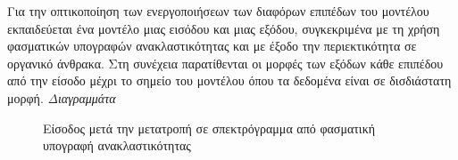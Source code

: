 Για την οπτικοποίηση των ενεργοποιήσεων των διαφόρων επιπέδων του μοντέλου εκπαιδεύεται ένα μοντέλο μιας εισόδου και μιας εξόδου, συγκεκριμένα  με τη χρήση φασματικών υπογραφών ανακλαστικότητας και με έξοδο την περιεκτικότητα σε οργανικό άνθρακα. Στη συνέχεια παρατίθενται οι μορφές των εξόδων κάθε επιπέδου από την είσοδο μέχρι το σημείο του μοντέλου όπου τα δεδομένα είναι σε δισδιάστατη μορφή.
\textit{Διαγραμμάτα}
\begin{figure}[H]
  \begin{center}
    
    \caption{Είσοδος μετά την μετατροπή σε σπεκτρόγραμμα από φασματική υπογραφή ανακλαστικότητας}
  \end{center}
\end{figure}

%
%    

